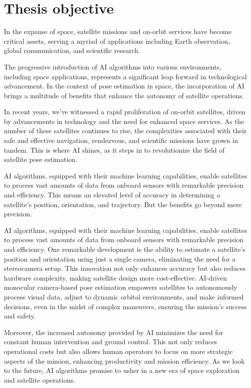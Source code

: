 \section{Thesis objective}

In the expanse of space, satellite missions and on-orbit services have become critical assets, serving a myriad of applications including Earth observation, global communication, and scientific research.

The progressive introduction of AI algorithms into various environments, including space applications, represents a significant leap forward in technological advancement. In the context of pose estimation in space, the incorporation of AI brings a multitude of benefits that enhance the  autonomy of satellite operations.

In recent years, we've witnessed a rapid proliferation of on-orbit satellites, driven by advancements in technology and the need for enhanced space services. As the number of these satellites continues to rise, the complexities associated with their safe and effective navigation, rendezvous, and scientific missions have grown in tandem. This is where AI shines, as it steps in to revolutionize the field of satellite pose estimation.

AI algorithms, equipped with their machine learning capabilities, enable satellites to process vast amounts of data from onboard sensors with remarkable precision and efficiency. This means an elevated level of accuracy in determining a satellite's position, orientation, and trajectory. But the benefits go beyond mere precision.

AI algorithms, equipped with their machine learning capabilities, enable satellites to process vast amounts of data from onboard sensors with remarkable precision and efficiency. One remarkable development is the ability to estimate a satellite's position and orientation using just a single camera, eliminating the need for a stereocamera setup. This innovation not only enhances accuracy but also reduces hardware complexity, making satellite design more cost-effective. AI-driven monocular camera-based pose estimation empowers satellites to autonomously process visual data, adjust to dynamic orbital environments, and make informed decisions, even in the midst of complex maneuvers, ensuring the mission's success and safety.

Moreover, the increased autonomy provided by AI minimizes the need for constant human intervention and ground control. This not only reduces operational costs but also allows human operators to focus on more strategic aspects of the mission, enhancing productivity and mission efficiency. As we look to the future, AI algorithms promise to usher in a new era of space exploration and satellite operations.

